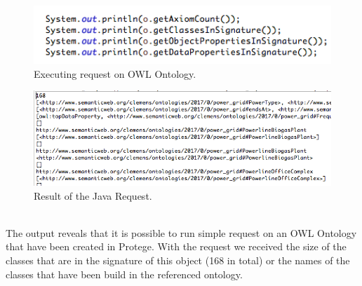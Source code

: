 \newpage

\begin{figure}[h]
\centering
\includegraphics[width=\textwidth]{img/apiCall.png}
\caption{Executing request on OWL Ontology.}
\label{fig:apiCall}
\end{figure}

\begin{figure}[h]
\centering
\includegraphics[width=\textwidth]{img/request.png}
\caption{Result of the Java Request.}
\label{fig:request}
\end{figure}

\\
The output reveals that it is possible to run simple request on an OWL Ontology that have been created in Protege. 
With the request we received the size  of the classes that are in the signature of this object (168 in total) or the names of the classes that have been build in the referenced ontology.

\newpage

 

